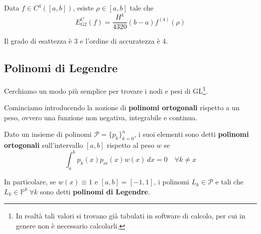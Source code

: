 \begin{figure}[ht]
\end{figure}

\begin{theorem}
    Data $f\in C^4([a,b])$, esiste $\rho\in[a,b]$ tale che 
    \[
    E_\text{G2}^C(f)=\frac{H^4}{4320} (b-a)f^{(4)}(\rho)
    \]
\end{theorem}
Il grado di esattezza è $3$ e l'ordine di accuratezza è $4$.

\subsection{Polinomi di Legendre}
Cerchiamo un modo più semplice per trovare i nodi e pesi di GL\footnote{In realtà tali valori si trovano già tabulati in software di calcolo, per cui in genere non è necessario calcolarli.}.

Cominciamo introducendo la nozione di \textbf{polinomi ortogonali} rispetto a un peso, ovvero una funzione non negativa, integrabile e continua.
\begin{definition}
    Dato un insieme di polinomi $\mathcal P=\{p_k\}_{k=0}^n$, i suoi elementi sono detti \textbf{polinomi ortogonali} sull'intervallo $[a,b]$ rispetto al peso $w$ se
    \[
    \int_{a}^b p_k(x) p_m(x)w(x)\,dx=0\quad\forall k\ne x
    \]
\end{definition}

In particolare, se $w(x)\equiv 1$ e $[a,b]=[-1,1]$, i polinomi $L_k\in \mathcal P$ e tali che $L_k\in \mathbb P^k\ \forall k$ sono detti \textbf{polinomi di Legendre}.

